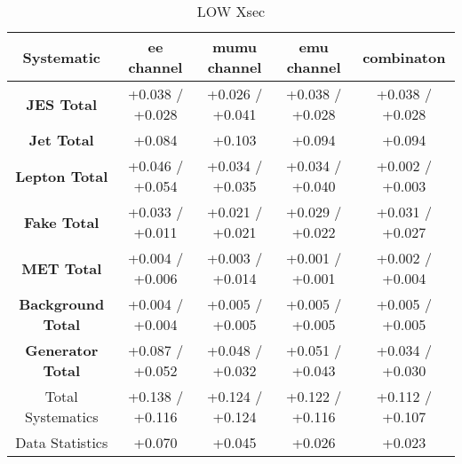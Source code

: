 \begin{table}[htbp]
\scriptsize
  \begin{center} 
  \begin{tabular}{|c|c|c|c|c|}
  \hline
     Systematic                            &  ee channel&  mumu channel&  emu channel&  combinaton\\
 \hline
\textbf{JES Total}                    &+0.038   / +0.028   & +0.026   / +0.041   & +0.038   / +0.028   & +0.038   / +0.028  \\
\textbf{Jet Total}                    &+0.084              & +0.103              & +0.094              & +0.094             \\
\textbf{Lepton Total}                 &+0.046   / +0.054   & +0.034   / +0.035   & +0.034   / +0.040   & +0.002   / +0.003  \\
\textbf{Fake Total}                   &+0.033   / +0.011   & +0.021   / +0.021   & +0.029   / +0.022   & +0.031   / +0.027  \\
\textbf{MET Total}                    &+0.004   / +0.006   & +0.003   / +0.014   & +0.001   / +0.001   & +0.002   / +0.004  \\
\textbf{Background Total}             &+0.004   / +0.004   & +0.005   / +0.005   & +0.005   / +0.005   & +0.005   / +0.005  \\
\textbf{Generator Total}              &+0.087   / +0.052   & +0.048   / +0.032   & +0.051   / +0.043   & +0.034   / +0.030  \\
  \hline
  \hline
Total Systematics                     &+0.138   / +0.116   & +0.124   / +0.124   & +0.122   / +0.116   & +0.112   / +0.107  \\
Data Statistics                       &+0.070              & +0.045              & +0.026              & +0.023             \\

  \hline
  \end{tabular}
  \end{center} 
  \label{tab:xsec_nominal_coscos_op_low}
  \caption{\coscosop LOW Xsec}
\end{table}





